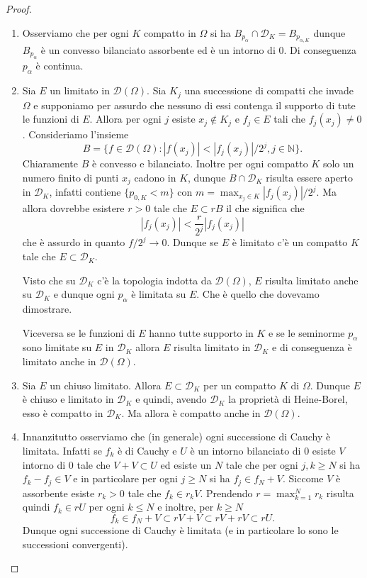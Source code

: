 \documentclass[italian,a4paper,oneside,headinclude]{scrbook}
\newcommand{\D}{\mathcal D}
\newcommand{\NN}{\mathbb N}
\newcommand{\abs}[1]{{\left|#1\right|}}
\begin{document}
\begin{proof}
  \cite[6.5]{Rudin}
  \begin{enumerate}
  \item
    Osserviamo che per ogni $K$ compatto in $\Omega$ si ha
    $B_{p_\alpha}\cap \D_K = B_{p_{\alpha,K}}$ dunque $B_{p_\alpha}$ è
    un convesso bilanciato assorbente ed è un intorno di $0$.
    Di conseguenza $p_\alpha$ è continua.

  \item
    Sia $E$ un limitato in $\D(\Omega)$.
    Sia $K_j$ una successione di compatti che invade $\Omega$ e
    supponiamo per assurdo che nessuno di essi contenga il supporto di
    tute le funzioni di $E$. Allora per ogni $j$ esiste
    $x_j\not \in K_j$ e $f_j\in E$ tali che $f_j(x_j)\neq 0$.
    Consideriamo l'insieme
    \[
    B = \{f\in \D(\Omega)\colon \abs{f(x_j)} < \abs{f_j(x_j)}/2^j, j\in \NN\}.
    \]
    Chiaramente $B$ è convesso e bilanciato. Inoltre per ogni compatto
    $K$ solo un numero finito di punti $x_j$ cadono in $K$, dunque
    $B\cap \D_K$ risulta essere aperto in $\D_K$, infatti contiene
    $\{p_{0,K}< m\}$ con $m=\max_{x_j\in K} \abs{f_j(x_j)}/2^j$.
    Ma allora dovrebbe esistere $r>0$ tale che $E\subset rB$ il che
    significa che
    \[
    \abs{f_j(x_j)} < \frac{r}{2^j}\abs{f_j(x_j)}
    \]
    che è assurdo in quanto $f/2^j \to 0$.
    Dunque se $E$ è limitato c'è un compatto $K$ tale che
    $E\subset \D_K$.

    Visto che su $\D_K$ c'è la topologia indotta da $\D(\Omega)$, $E$
    risulta limitato anche su $\D_K$ e dunque ogni $p_\alpha$ è
    limitata su $E$. Che è quello che dovevamo dimostrare.

    Viceversa se le funzioni di $E$ hanno tutte supporto in $K$ e se
    le seminorme $p_\alpha$ sono limitate su $E$ in $\D_K$ allora $E$
    risulta limitato in $\D_K$ e di conseguenza è limitato anche in
    $\D(\Omega)$.

  \item
    Sia $E$ un chiuso limitato. Allora $E\subset \D_K$ per un compatto
    $K$ di $\Omega$. Dunque $E$ è chiuso e limitato in $\D_K$ e
    quindi, avendo $\D_K$ la proprietà di Heine-Borel, esso è compatto
    in $\D_K$. Ma allora è compatto anche in $\D(\Omega)$.

  \item
    Innanzitutto osserviamo che (in generale) ogni successione di
    Cauchy è limitata.
    Infatti se $f_k$ è di Cauchy e $U$ è un intorno bilanciato di $0$ esiste $V$
    intorno di $0$ tale che $V+V\subset U$ ed esiste un $N$ tale che
    per ogni $j,k \ge N$ si ha $f_k-f_j \in V$ e in particolare per
    ogni $j\ge N$ si ha $f_j \in f_N + V$. Siccome $V$ è assorbente
    esiste $r_k>0$ tale che $f_k\in r_k V$. Prendendo
    $r=\max_{k=1}^N r_k$ risulta quindi $f_k \in rU$ per ogni
    $k\le N$ e inoltre, per $k\ge N$
    \[
    f_k \in f_N + V \subset r V + V \subset r V + rV \subset r U.
    \]
    Dunque ogni successione di Cauchy è limitata (e in particolare lo
    sono le successioni convergenti).


\end{enumerate}
\end{proof}
\end{document}

